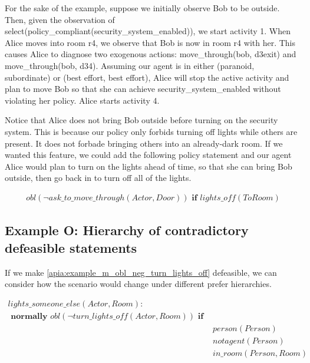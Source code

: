 For the sake of the example, suppose we initially observe Bob to be outside.
Then, given the observation of select(policy\_compliant(security\_system\_enabled)), we start activity 1.
When Alice moves into room r4, we observe that Bob is now in room r4 with her.
This causes Alice to diagnose two exogenous actions: move\_through(bob, d3exit) and move\_through(bob, d34).
Assuming our agent is in either (paranoid, subordinate) or (best effort, best effort), Alice will stop the active activity and plan to move Bob so that she can achieve security\_system\_enabled without violating her policy.
Alice starts activity 4.

Notice that Alice does not bring Bob outside before turning on the security system.
This is because our policy only forbids turning off lights while others are present.
It does not forbade bringing others into an already-dark room.
If we wanted this feature, we could add the following policy statement and our agent Alice would plan to turn on the lights ahead of time, so that she can bring Bob outside, then go back in to turn off all of the lights.

\begin{equation}
\begin{split}
obl(\neg ask\_to\_move\_through(Actor, Door)) \textbf{ if }
    lights\_off(ToRoom)
\end{split}
\end{equation}

\subsection{Example O: Hierarchy of contradictory defeasible statements}

If we make \cref{apia:example_m_obl_neg_turn_lights_off} defeasible, we can consider how the scenario would change under different prefer hierarchies.

\begin{equation}
\begin{split}
lights\_someone\_else(Actor, Room): \\
\textbf{ normally } obl(\neg turn\_lights\_off(Actor, Room)) \textbf{ if } \\
    & person(Person) \\
    & not agent(Person) \\
    & in\_room(Person, Room) \\
\end{split}
\end{equation}

